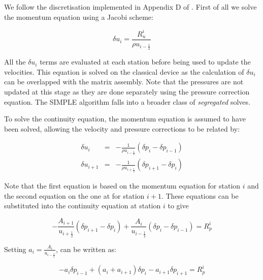 We follow the discretisation implemented in Appendix D of \cite{gupta1993development}.
First of all we solve the momentum equation  using a Jacobi scheme:

\begin{equation}
  \delta u_i = \frac{R_u^i}{\rho u_{i-\frac{1}{2}}}
  \label{eqn-simple-inco-umom}
\end{equation}

All the $\delta u_i$ terms are evaluated at each station before being used to update
the velocities. This equation is solved on the classical device as the calculation
of $\delta u_i$ can be overlapped with the matrix assembly. Note that the pressures 
are not updated at this stage as they are done separately using the pressure correction 
equation. The SIMPLE algorithm falls into a broader class of {\it segregated} solves.

To solve the continuity equation, the momentum equation is assumed to have been solved,
allowing the velocity and pressure corrections to be related by:

\begin{equation}
  \begin{array}{rcl}
    \delta u_i &=& -\frac{1}{\rho u_{i-\frac{1}{2}}} (\delta p_i - \delta p_{i-1}) \\[8pt]
    \delta u_{i+1} &=& -\frac{1}{\rho u_{i+\frac{1}{2}}} (\delta p_{i+1} - \delta p_{i})
  \end{array}
  \label{eqn-simple-inco-dudp}
\end{equation}

Note that the first equation is based on the momentum equation for station $i$ and
the second equation on the one at for station $i+1$.
These equations can be substituted into the continuity equation 
at station $i$ to give

\begin{equation}
    -\frac{A_{i+1}}{u_{i+\frac{1}{2}}} (\delta p_{i+1} - \delta p_{i})
    +\frac{A_{i}}{u_{i-\frac{1}{2}}} (\delta p_{i} - \delta p_{i-1}) = R_p^i 
  \label{eqn-simple-inco-pceqn1}
\end{equation}

Setting $a_i = \frac{A_{i}}{u_{i-\frac{1}{2}}}$,  can
be written as:

\begin{equation}
    -a_{i}\delta p_{i-1} + (a_{i} + a_{i+1})\delta p_{i} - a_{i+1}\delta p_{i+1}
    = R_p^i 
  \label{eqn-simple-inco-pceqn2}
\end{equation}

